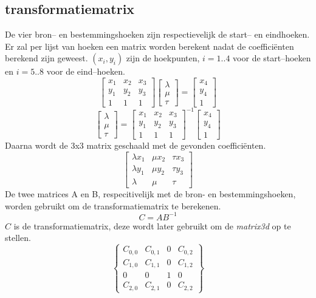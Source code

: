 \subsection{transformatiematrix}
De vier bron-- en bestemmingshoeken zijn respectievelijk de start-- en eindhoeken. Er zal per lijst van hoeken een matrix worden berekent nadat de coefficiënten berekend zijn geweest. $(x_i, y_i)$ zijn de hoekpunten, $i = 1..4$ voor de start--hoeken en $i = 5..8$ voor de eind--hoeken. \cite{redrawImageFrom3dPerspectiveTo2d}
$$ \begin{bmatrix}
x_1 & x_2 & x_3 \\ y_1 & y_2 & y_3 \\ 1 & 1 & 1
\end{bmatrix} \begin{bmatrix}
\lambda \\ \mu \\ \tau
\end{bmatrix} =
\begin{bmatrix}
x_4 \\ y_4 \\ 1
\end{bmatrix}
$$
$$ \begin{bmatrix}
\lambda \\ \mu \\ \tau
\end{bmatrix} =\begin{bmatrix}
x_1 & x_2 & x_3 \\ y_1 & y_2 & y_3 \\ 1 & 1 & 1
\end{bmatrix}^{-1}
\begin{bmatrix}
x_4 \\ y_4 \\ 1
\end{bmatrix}
$$
Daarna wordt de 3x3 matrix geschaald met de gevonden coefficiënten.
$$
\begin{bmatrix}
\lambda x_1 & \mu x_2 & \tau x_3 \\ \lambda y_1 & \mu y_2 & \tau y_3 \\ \lambda & \mu & \tau
\end{bmatrix}
$$
De twee matrices A en B, respecitivelijk met de bron- en bestemmingshoeken, worden gebruikt om de transformatiematrix te berekenen.
$$ C = AB^{-1}$$
$C$ is de transformatiematrix, deze wordt later gebruikt om de {\it matrix3d} op te stellen. \cite{projectiveTransformation}
$$
\begin{Bmatrix}
C_{0,0}	& 	C_{0,1}	&	0	&	C_{0,2} 	\\
C_{1,0}	&	C_{1,1} 	&	0	&	C_{1,2} 	\\
0		&	0		&	1	&	0		\\
C_{2,0}	&	C_{2,1}	&	0	&	C_{2,2}
\end{Bmatrix}
$$
